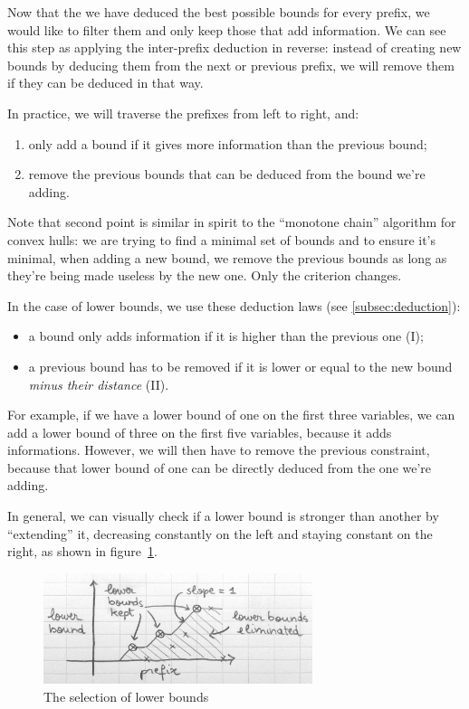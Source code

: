 \documentclass[a4paper,10pt]{article}
\begin{document}
Now that the we have deduced the best possible bounds for every prefix, we would like to filter them and only keep those that add information. We can see this step as applying the inter-prefix deduction in reverse: instead of creating new bounds by deducing them from the next or previous prefix, we will remove them if they can be deduced in that way.

In practice, we will traverse the prefixes from left to right, and:
\begin{enumerate}
    \item only add a bound if it gives more information than the previous bound;
    \item remove the previous bounds that can be deduced from the bound we're adding.
\end{enumerate}

Note that second point is similar in spirit to the ``monotone chain'' algorithm for convex hulls: we are trying to find a minimal set of bounds and to ensure it's minimal, when adding a new bound, we remove the previous bounds as long as they're being made useless by the new one. Only the criterion changes.

In the case of lower bounds, we use these deduction laws (see \ref{subsec:deduction}):
\begin{itemize}
    \item a bound only adds information if it is higher than the previous one (I);
    \item a previous bound has to be removed if it is lower or equal to the new bound \emph{minus their distance} (II).
\end{itemize}

For example, if we have a lower bound of one on the first three variables, we can add a lower bound of three on the first five variables, because it adds informations. However, we will then have to remove the previous constraint, because that lower bound of one can be directly deduced from the one we're adding.

In general, we can visually check if a lower bound is stronger than another by ``extending'' it, decreasing constantly on the left and staying constant on the right, as shown in figure~\ref{fig:lower-bounds}.

\begin{figure}[h!]
    \centering
    \includegraphics[width=0.7\textwidth]{lower-bounds}
    \caption{The selection of lower bounds}
    \label{fig:lower-bounds}
\end{figure}
\end{document}
